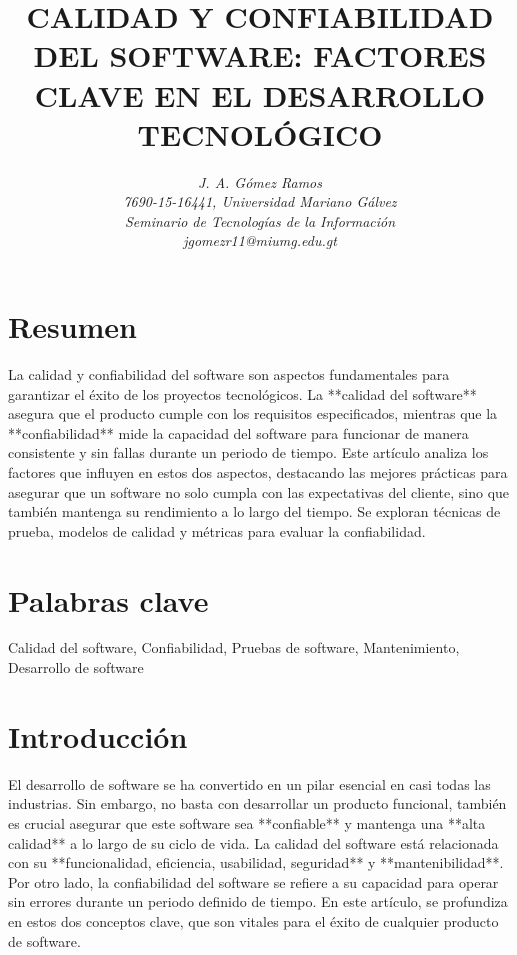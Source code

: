 \documentclass[12pt]{article}
\begin{document}
\title{\textbf{CALIDAD Y CONFIABILIDAD DEL SOFTWARE: FACTORES CLAVE EN EL DESARROLLO TECNOLÓGICO}}
\author{\textit{J. A. Gómez Ramos}\\
\textit{7690-15-16441, Universidad Mariano Gálvez}\\
\textit{Seminario de Tecnologías de la Información}\\
\textit{jgomezr11@miumg.edu.gt}}
\date{}
\maketitle

\section*{Resumen}
La calidad y confiabilidad del software son aspectos fundamentales para garantizar el éxito de los proyectos tecnológicos. La **calidad del software** asegura que el producto cumple con los requisitos especificados, mientras que la **confiabilidad** mide la capacidad del software para funcionar de manera consistente y sin fallas durante un periodo de tiempo. Este artículo analiza los factores que influyen en estos dos aspectos, destacando las mejores prácticas para asegurar que un software no solo cumpla con las expectativas del cliente, sino que también mantenga su rendimiento a lo largo del tiempo. Se exploran técnicas de prueba, modelos de calidad y métricas para evaluar la confiabilidad.

\section*{Palabras clave}
Calidad del software, Confiabilidad, Pruebas de software, Mantenimiento, Desarrollo de software

\section{Introducción}
El desarrollo de software se ha convertido en un pilar esencial en casi todas las industrias. Sin embargo, no basta con desarrollar un producto funcional, también es crucial asegurar que este software sea **confiable** y mantenga una **alta calidad** a lo largo de su ciclo de vida. La calidad del software está relacionada con su **funcionalidad, eficiencia, usabilidad, seguridad** y **mantenibilidad**. Por otro lado, la confiabilidad del software se refiere a su capacidad para operar sin errores durante un periodo definido de tiempo. En este artículo, se profundiza en estos dos conceptos clave, que son vitales para el éxito de cualquier producto de software.
\end{document}
